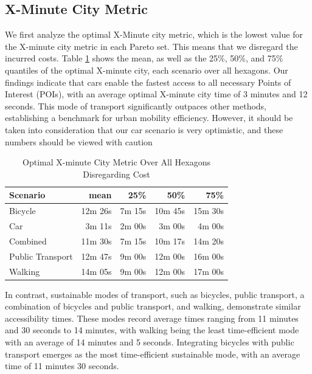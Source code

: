 \subsection{X-Minute City Metric}
\label{subsec:15_minute_city_metric}

We first analyze the optimal X-Minute city metric, which is the lowest value for the X-minute city metric in each Pareto set.
This means that we disregard the incurred costs.
Table \ref{tab:optimal_x_minute_city_metric} shows the mean, as well as the 25\%, 50\%, and 75\% quantiles of the optimal X-minute city, each scenario over all hexagons.
Our findings indicate that cars enable the fastest access to all necessary Points of Interest (POIs), with an average optimal X-minute city time of 3 minutes and 12 seconds. 
This mode of transport significantly outpaces other methods, establishing a benchmark for urban mobility efficiency.
However, it should be taken into consideration that our car scenario is very optimistic, and these numbers should be viewed with caution

\begin{table}
  \caption{Optimal X-minute City Metric Over All Hexagons Disregarding Cost}
  \label{tab:optimal_x_minute_city_metric}
  \begin{center}
    \begin{tabular}{|l|r|r|r|r|}
    \hline
    Scenario & mean & 25\% & 50\% & 75\% \\
    \hline
    Bicycle & 12m 26s & 7m 15s & 10m 45s & 15m 30s \\
    \hline
    Car & 3m 11s & 2m 00s & 3m 00s & 4m 00s \\
    \hline
    Combined & 11m 30s & 7m 15s & 10m 17s & 14m 20s \\
    \hline
    Public Transport & 12m 47s & 9m 00s & 12m 00s & 16m 00s \\
    \hline
    Walking & 14m 05s & 9m 00s & 12m 00s & 17m 00s \\
    \hline
    \end{tabular}
  \end{center}
\end{table}

In contrast, sustainable modes of transport, such as bicycles, public transport, a combination of bicycles and public transport, and walking, demonstrate similar accessibility times. 
These modes record average times ranging from 11 minutes and 30 seconds to 14 minutes, with walking being the least time-efficient mode with an average of 14 minutes and 5 seconds. 
Integrating bicycles with public transport emerges as the most time-efficient sustainable mode, with an average time of 11 minutes 30 seconds. 

